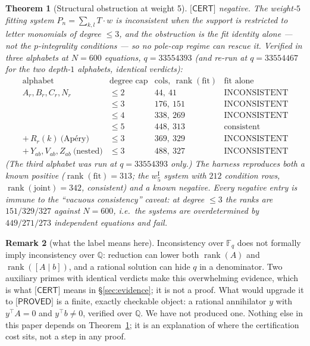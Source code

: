 \documentclass[11pt,reqno]{amsart}
\theoremstyle{plain}
\newtheorem{theorem}{Theorem}[section]
\theoremstyle{definition}
\newtheorem{remark}[theorem]{Remark}
\theoremstyle{remark}
\numberwithin{equation}{section}
\newcommand{\QQ}{\mathbb{Q}}
\newcommand{\FF}{\mathbb{F}}
\newcommand{\rank}{\operatorname{rank}}
\newcommand{\PROVED}{\textsf{[PROVED]}}
\newcommand{\CERT}{\textsf{[CERT]}}
\begin{document}
\begin{theorem}[Structural obstruction at weight 5]\label{thm:degfit}
$\CERT$ negative. The weight-$5$ fitting system $P_n=\sum_{k,l}T\cdot w$ is
\emph{inconsistent} when the support is restricted to letter monomials of degree $\le3$, and
the obstruction is the \emph{fit identity alone} --- not the $p$-integrality conditions --- so
no pole-cap regime can rescue it. Verified in three alphabets at $N=600$ equations,
$q=33554393$ (and re-run at $q=33554467$ for the two depth-$1$ alphabets, identical verdicts):
\[
\begin{array}{lccl}
\text{alphabet} & \text{degree cap} & \text{cols},\ \rank(\mathrm{fit}) & \text{fit alone}\\\hline
A_r,B_r,C_r,N_r & \le2 & 44,\ 41 & \text{INCONSISTENT}\\
 & \le3 & 176,\ 151 & \text{INCONSISTENT}\\
 & \le4 & 338,\ 269 & \text{INCONSISTENT}\\
 & \le5 & 448,\ 313 & \text{consistent}\\
+\,R_r(k)\ \text{(Ap\'ery)} & \le3 & 369,\ 329 & \text{INCONSISTENT}\\
+\,Y_{ab},V_{ab},Z_{ab}\ \text{(nested)} & \le3 & 488,\ 327 & \text{INCONSISTENT}
\end{array}
\]
(The third alphabet was run at $q=33554393$ only.)
The harness reproduces both a known positive ($\rank(\mathrm{fit})=313$; the $w_5^{\mathrm I}$
system with $212$ condition rows, $\rank(\mathrm{joint})=342$, consistent) and a known negative.
Every negative entry is immune to the ``vacuous consistency'' caveat: at degree $\le3$ the ranks
are $151/329/327$ against $N=600$, i.e.\ the systems are overdetermined by $449/271/273$
independent equations and fail.
\end{theorem}

\begin{remark}[what the label means here]
Inconsistency over $\FF_q$ does not formally imply inconsistency over $\QQ$: reduction can lower
both $\rank(A)$ and $\rank([A\mid b])$, and a rational solution can hide $q$ in a denominator.
Two auxiliary primes with identical verdicts make this overwhelming evidence, which is what
$\CERT$ means in \S\ref{sec:evidence}; it is not a proof. What would upgrade it to $\PROVED$ is
a finite, exactly checkable object: a rational annihilator $y$ with $y^\top A=0$ and
$y^\top b\ne0$, verified over $\QQ$. We have not produced one. Nothing else in this paper
depends on Theorem~\ref{thm:degfit}; it is an explanation of where the certification cost sits,
not a step in any proof.
\end{remark}
\end{document}
